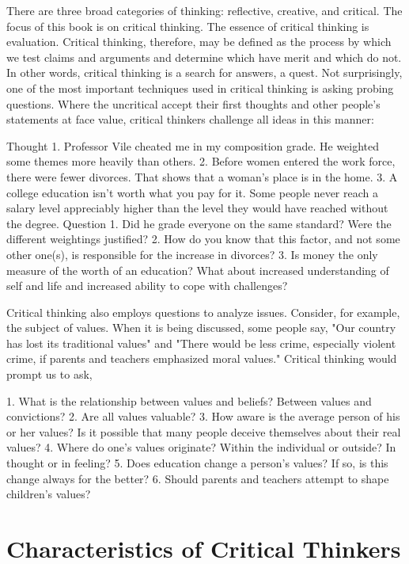 \documentclass{book}
\begin{document}
There are three broad categories of thinking: reflective, creative, and critical. The focus of this book is on critical thinking. The essence of critical thinking is evaluation. Critical thinking, therefore, may be defined as the process by which we test claims and arguments and determine which have merit and which do not. In other words, critical thinking is a search for answers, a quest. Not surprisingly, one of the most important techniques used in critical thinking is asking probing questions. Where the uncritical accept their first thoughts and other people’s statements at face value, critical thinkers challenge all ideas in this manner:

Thought
1. Professor Vile cheated me in my composition grade. He weighted some themes more heavily than others.
2. Before women entered the work force, there were fewer divorces. That shows that a woman’s place is in the home.
3. A college education isn’t worth what you pay for it. Some people never reach a salary level appreciably higher than the level they would have reached without the degree.
Question
1. Did he grade everyone on the same standard? Were the different weightings justified?
2. How do you know that this factor, and not some other one(s), is responsible for the increase in divorces?
3. Is money the only measure of the worth of an education? What about increased understanding of self and life and increased ability to cope with challenges?

Critical thinking also employs questions to analyze issues. Consider, for example, the subject of values. When it is being discussed, some people say, "Our country has lost its traditional values" and "There would be less crime, especially violent crime, if parents and teachers emphasized moral values." Critical thinking would prompt us to ask,

1. What is the relationship between values and beliefs? Between values and convictions?
2. Are all values valuable?
3. How aware is the average person of his or her values? Is it possible that many people deceive themselves about their real values?
4. Where do one’s values originate? Within the individual or outside? In thought or in feeling?
5. Does education change a person’s values? If so, is this change always for the better?
6. Should parents and teachers attempt to shape children’s values?

\section{Characteristics of Critical Thinkers}
\end{document}
